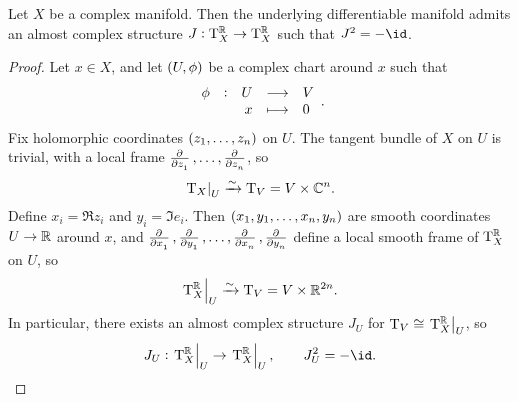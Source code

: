 
\begin{proposition}
Let $ X $ be a complex manifold. Then the underlying differentiable manifold admits an almost complex structure $ J : \mathrm{T}_X^{\mathbb{R}} \to \mathrm{T}_X^{\mathbb{R}} $ such that $ J^2 = -\id $.
\end{proposition}

\begin{proof}
Let $ x \in X $, and let $ \br{U, \phi} $ be a complex chart around $ x $ such that
$$ \function[\phi]{U}{V}{x}{0}. $$
Fix holomorphic coordinates $ \br{z_1, \dots, z_n} $ on $ U $. The tangent bundle of $ X $ on $ U $ is trivial, with a local frame $ \tpd{}{z_1}, \dots, \tpd{}{z_n} $, so
$$ \left. \mathrm{T}_X \right|_U \xrightarrow{\sim} \mathrm{T}_V = V \times \mathbb{C}^n. $$
Define $ x_i = \Re z_i $ and $ y_i = \Im e_i $. Then $ \br{x_1, y_1, \dots, x_n, y_n} $ are smooth coordinates $ U \to \mathbb{R} $ around $ x $, and $ \tpd{}{x_1}, \tpd{}{y_1}, \dots, \tpd{}{x_n}, \tpd{}{y_n} $ define a local smooth frame of $ \mathrm{T}_X^{\mathbb{R}} $ on $ U $, so
$$ \left. \mathrm{T}_X^{\mathbb{R}} \right|_U \xrightarrow{\sim} \mathrm{T}_V = V \times \mathbb{R}^{2n}. $$
In particular, there exists an almost complex structure $ J_U $ for $ \mathrm{T}_V \cong \left. \mathrm{T}_X^{\mathbb{R}} \right|_U $, so
$$ J_U : \eval{\T_X^\RR}_U \to \eval{\T_X^\RR}_U, \qquad J_U^2 = -\id. $$

\pagebreak


\end{proof}
